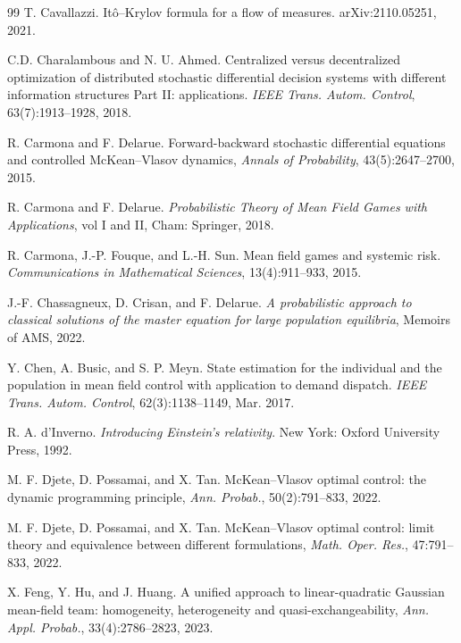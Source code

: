 \documentclass{amsart}
\theoremstyle{definition}
\theoremstyle{remark}
\numberwithin{equation}{section}
\begin{document}
\begin{thebibliography}{99}
T. Cavallazzi. It\^o--Krylov formula for a flow of measures. arXiv:2110.05251, 2021.


C.D. Charalambous and N. U. Ahmed.
Centralized versus decentralized optimization of distributed stochastic differential decision systems with different information
structures Part II: applications.
{\it IEEE Trans. Autom. Control}, 63(7):1913--1928,  2018.


R. Carmona and F. Delarue. Forward-backward stochastic differential equations and controlled
McKean--Vlasov dynamics, {\it  Annals of Probability}, { 43}(5):2647--2700, 2015.



R. Carmona and F. Delarue. {\it Probabilistic Theory of Mean Field Games
with Applications}, vol I and II, Cham: Springer, 2018.




R. Carmona, J.-P. Fouque, and L.-H. Sun.
Mean field games and systemic risk.
{\it Communications in Mathematical Sciences}, 13(4):911--933, 2015.

 J.-F.
Chassagneux, D. Crisan, and F. Delarue. {\it  A probabilistic approach to classical solutions of the master
equation for large population equilibria}, Memoirs of AMS, 2022.



Y. Chen, A. Busic, and S. P. Meyn.
State estimation for the individual and the
population in mean field control with
application to demand dispatch.
{\it IEEE Trans. Autom. Control}, 62(3):1138--1149, Mar. 2017.


R. A. d'Inverno. {\it Introducing Einstein's relativity}.  New York: Oxford University Press, 1992.


M. F. Djete, D. Possamai,  and X. Tan. McKean--Vlasov optimal control: the dynamic programming
principle, {\it Ann. Probab.},  50(2):791--833, 2022.

M. F. Djete, D. Possamai,  and X. Tan.
McKean--Vlasov optimal control: limit theory and equivalence between different formulations, {\it Math. Oper. Res.}, 47:791--833, 2022.





X. Feng, Y. Hu, and J. Huang.
A unified approach to linear-quadratic Gaussian
mean-field team: homogeneity, heterogeneity and quasi-exchangeability,
{\it Ann. Appl. Probab.}, 33(4):2786--2823, 2023.




\end{thebibliography}
\end{document}
